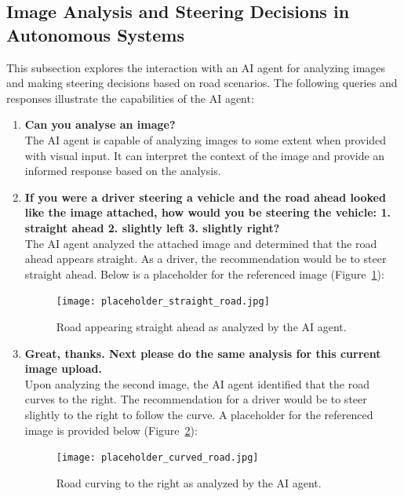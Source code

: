 
\subsection{Image Analysis and Steering Decisions in Autonomous Systems}

This subsection explores the interaction with an AI agent for analyzing images and making steering decisions based on road scenarios. The following queries and responses illustrate the capabilities of the AI agent:

\begin{enumerate}
    \item \textbf{Can you analyse an image?}\\
    The AI agent is capable of analyzing images to some extent when provided with visual input. It can interpret the context of the image and provide an informed response based on the analysis.

    \item \textbf{If you were a driver steering a vehicle and the road ahead looked like the image attached, how would you be steering the vehicle: 1. straight ahead 2. slightly left 3. slightly right?}\\
    The AI agent analyzed the attached image and determined that the road ahead appears straight. As a driver, the recommendation would be to steer straight ahead. Below is a placeholder for the referenced image (Figure~\ref{fig:straight_road}):

    \begin{figure}[h!]
        \centering
        \texttt{[image: placeholder\_straight\_road.jpg]}
        \caption{Road appearing straight ahead as analyzed by the AI agent.}
        \label{fig:straight_road}
    \end{figure}

    \item \textbf{Great, thanks. Next please do the same analysis for this current image upload.}\\
    Upon analyzing the second image, the AI agent identified that the road curves to the right. The recommendation for a driver would be to steer slightly to the right to follow the curve. A placeholder for the referenced image is provided below (Figure~\ref{fig:curved_road}):

    \begin{figure}[h!]
        \centering
        \texttt{[image: placeholder\_curved\_road.jpg]}
        \caption{Road curving to the right as analyzed by the AI agent.}
        \label{fig:curved_road}
    \end{figure}
\end{enumerate}


